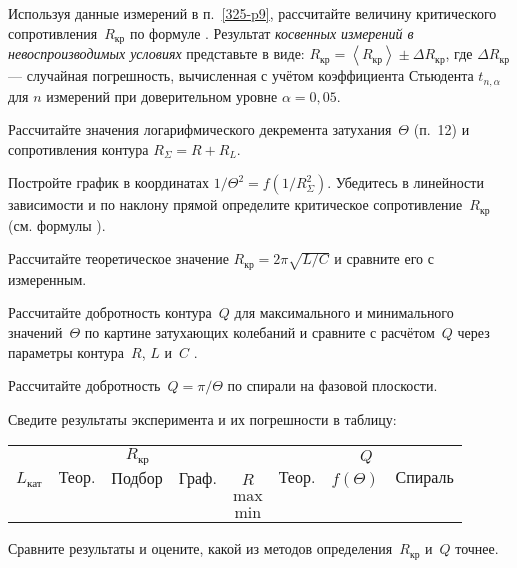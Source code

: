 \begin{lab:task}
\item 
Используя данные измерений в п.~\ref{325-p9}, рассчитайте величину критического 
сопротивления~$R_{кр}$ по формуле . Результат \emph{косвенных измерений в невоспроизводимых условиях} представьте в виде: $R_{кр}=\left<R_{кр}\right> \pm \Delta R_{кр}$, 
где $\Delta R_{кр}$ --- случайная погрешность, вычисленная с учётом коэффициента Стьюдента 
$t_{n,\alpha}$ для $n$ измерений при доверительном уровне $\alpha=0,05$.


\item Рассчитайте значения логарифмического декремента затухания~$\Theta$ (п.~12) 
и сопротивления контура $R_{\Sigma}=R+R_L$.

Постройте график в координатах $1/\Theta^2 =f(1/R^2_{\Sigma})$. Убедитесь 
в линейности зависимости и по наклону прямой определите критическое 
сопротивление~$R_\text{кр}$ (см. формулы ). 

\item Рассчитайте теоретическое значение $R_\text{кр} = 2\pi\sqrt{L / C}$
и сравните его с измеренным.

\item Рассчитайте добротность контура~$Q$ для максимального и минимального
значений~$\Theta$ по картине затухающих колебаний и сравните с расчётом~$Q$
через параметры контура~$R$, $L$ и~$C$  .

\item Рассчитайте добротность~$Q=\pi/\Theta$ по спирали на фазовой плоскости.

\item Сведите результаты эксперимента и их погрешности в таблицу:
\begin{center}\small
\begin{tabular}{|c|c|c|c|c|c|c|c|}
\hline
& \multicolumn{3}{c|}{$R_{\text{кр}}$} &  & \multicolumn{3}{c|}{$Q$} \\
\cline{2-4}
\cline{6-8}
$L_{\text{кат}}$ & $\text{Теор.}$ & $\text{Подбор}$ & $\text{Граф.}$ & $R$ &
$\text{Теор.}$ & $f(\Theta)$ & $\text{Спираль}$  \\
\hline
& & & & $\text{max}$ & & &  \\
& & & & $\text{min}$ & & &  \\
\hline
\end{tabular}
\end{center}

\item Сравните результаты и оцените, какой из методов определения~$R_\text{кр}$ и~$Q$ 
точнее.

\end{lab:task}


